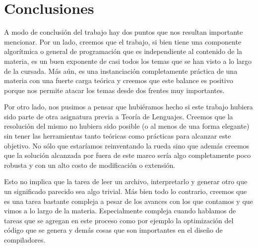 \section{Conclusiones}

A modo de conclusión del trabajo hay dos puntos que nos resultan importante mencionar. Por un lado, creemos que el trabajo, si bien
tiene una componente algorítmica o general de programación que es independiente al contenido de la materia, es un buen exponente
de casi todos los temas que se han visto a lo largo de la cursada. Más aún, es una instanciación completamente práctica de una
materia con una fuerte carga teórica y creemos que este balance es positivo porque nos permite atacar los temas desde dos
frentes muy importantes.

Por otro lado, nos pusimos a pensar que hubiéramos hecho si este trabajo hubiera sido parte de otra asignatura previa a 
Teoría de Lenguajes. Creemos que la resolución del mismo no hubiera sido posible (o al menos de una forma elegante) sin
tener las herramientas tanto teóricas como prácticas para alcanzar este objetivo. No sólo que estaríamos reinventando la rueda
sino que además creemos que la solución alcanzada por fuera de este marco sería algo completamente poco robusta y 
con un alto costo de modificación o extensión.

Esto no implica que la tarea de leer un archivo, interpretarlo y generar otro que un significado parecido sea algo trivial.
Más bien todo lo contrario, creemos que es una tarea bastante compleja a pesar de los avances con los que contamos y que 
vimos a lo largo de la materia. Especialmente compleja cuando hablamos de tareas que se agregan en este proceso como
por ejemplo la optimización del código que se genera y demás cosas que son importantes en el diseño de compiladores.